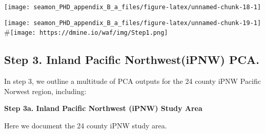 \documentclass[]{article}
\newenvironment{Shaded}{\begin{snugshade}}{\end{snugshade}}
\newcommand{\CommentTok}[1]{\textcolor[rgb]{0.56,0.35,0.01}{\textit{#1}}}
\newcommand{\DataTypeTok}[1]{\textcolor[rgb]{0.13,0.29,0.53}{#1}}
\newcommand{\DecValTok}[1]{\textcolor[rgb]{0.00,0.00,0.81}{#1}}
\newcommand{\KeywordTok}[1]{\textcolor[rgb]{0.13,0.29,0.53}{\textbf{#1}}}
\newcommand{\NormalTok}[1]{#1}
\newcommand{\OperatorTok}[1]{\textcolor[rgb]{0.81,0.36,0.00}{\textbf{#1}}}
\newcommand{\StringTok}[1]{\textcolor[rgb]{0.31,0.60,0.02}{#1}}
\begin{document}
\texttt{[image: seamon\_PHD\_appendix\_B\_a\_files/figure-latex/unnamed-chunk-18-1]}

\begin{Shaded}
\end{Shaded}

\texttt{[image: seamon\_PHD\_appendix\_B\_a\_files/figure-latex/unnamed-chunk-19-1]}
\#\texttt{[image: https://dmine.io/waf/img/Step1.png]}

\hypertarget{step-3.-inland-pacific-northwestipnw-pca.}{%
\subsection{Step 3. Inland Pacific Northwest(iPNW)
PCA.}\label{step-3.-inland-pacific-northwestipnw-pca.}}

In step 3, we outline a multitude of PCA outputs for the 24 county iPNW
Pacific Norwest region, including:

\textbf{Step 3a. Inland Pacific Northwest (iPNW) Study Area}

Here we document the 24 county iPNW study area.
\end{document}
